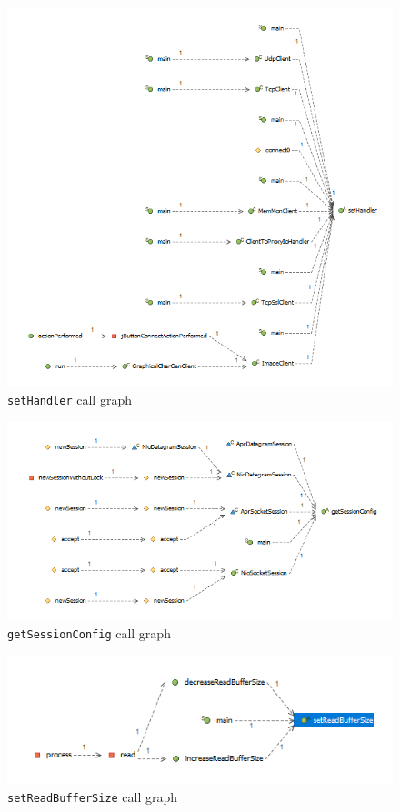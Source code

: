 \begin{figure}[H]
    \centering
    \includegraphics[width=\textwidth]{images/sethandler.png}
    \caption{\texttt{setHandler} call graph}
    \label{fig:sethandler}
\end{figure}

\begin{figure}[H]
    \centering
    \includegraphics[width=\textwidth]{images/getsessionconfig.png}
    \caption{\texttt{getSessionConfig} call graph}
    \label{fig:getSessionConfig}
\end{figure}


\begin{figure}[H]
    \centering
    \includegraphics[width=\textwidth]{images/setreadbuffersize.png}
    \caption{\texttt{setReadBufferSize} call graph}
    \label{fig:setreadbuffersize}
\end{figure}

